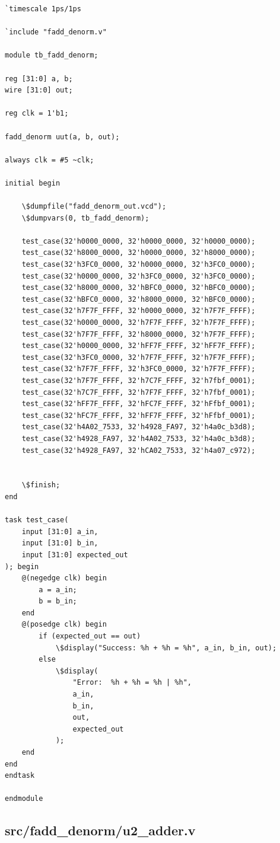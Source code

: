 \documentclass{article}
\begin{document}
\begin{lstlisting}
`timescale 1ps/1ps

`include "fadd_denorm.v"

module tb_fadd_denorm;

reg [31:0] a, b;
wire [31:0] out;

reg clk = 1'b1;

fadd_denorm uut(a, b, out);

always clk = #5 ~clk;

initial begin

	\$dumpfile("fadd_denorm_out.vcd");
	\$dumpvars(0, tb_fadd_denorm);

    test_case(32'h0000_0000, 32'h0000_0000, 32'h0000_0000);
    test_case(32'h8000_0000, 32'h0000_0000, 32'h8000_0000);
    test_case(32'h3FC0_0000, 32'h0000_0000, 32'h3FC0_0000);
    test_case(32'h0000_0000, 32'h3FC0_0000, 32'h3FC0_0000);
    test_case(32'h8000_0000, 32'hBFC0_0000, 32'hBFC0_0000);
    test_case(32'hBFC0_0000, 32'h8000_0000, 32'hBFC0_0000);
    test_case(32'h7F7F_FFFF, 32'h0000_0000, 32'h7F7F_FFFF);
    test_case(32'h0000_0000, 32'h7F7F_FFFF, 32'h7F7F_FFFF);
    test_case(32'h7F7F_FFFF, 32'h8000_0000, 32'h7F7F_FFFF);
    test_case(32'h0000_0000, 32'hFF7F_FFFF, 32'hFF7F_FFFF);
    test_case(32'h3FC0_0000, 32'h7F7F_FFFF, 32'h7F7F_FFFF);
    test_case(32'h7F7F_FFFF, 32'h3FC0_0000, 32'h7F7F_FFFF);
    test_case(32'h7F7F_FFFF, 32'h7C7F_FFFF, 32'h7fbf_0001);
    test_case(32'h7C7F_FFFF, 32'h7F7F_FFFF, 32'h7fbf_0001); 
    test_case(32'hFF7F_FFFF, 32'hFC7F_FFFF, 32'hFfbf_0001);
    test_case(32'hFC7F_FFFF, 32'hFF7F_FFFF, 32'hFfbf_0001);
    test_case(32'h4A02_7533, 32'h4928_FA97, 32'h4a0c_b3d8);
    test_case(32'h4928_FA97, 32'h4A02_7533, 32'h4a0c_b3d8);
    test_case(32'h4928_FA97, 32'hCA02_7533, 32'h4a07_c972);
    
    
    \$finish;
end

task test_case(
    input [31:0] a_in,
    input [31:0] b_in,
    input [31:0] expected_out
); begin
    @(negedge clk) begin
        a = a_in;
        b = b_in;
    end
    @(posedge clk) begin
        if (expected_out == out)
            \$display("Success: %h + %h = %h", a_in, b_in, out);
        else
            \$display(
                "Error:  %h + %h = %h | %h",
                a_in,
                b_in,
                out,
                expected_out
            );
    end
end
endtask

endmodule
\end{lstlisting}

\subsection{src/fadd\_denorm/u2\_adder.v}
\end{document}
